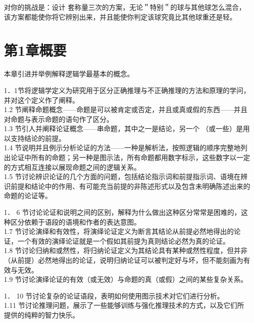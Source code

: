 对你的挑战是：设计 套称量三次的方案，无论＂特别＂的球与其他球怎么混合，该方案都能使你将它辨别出来，并且能使你判定该球究竟比其他球重还是轻。

\section*{第1章概要}
本章引进并举例解释逻辑学最基本的概念。

1．1节将逻辑学定义为研究用于区分正确推理与不正确推理的方法和原理的学问，并对这个定义作了阐释。\\
1.2 节阐释命题概念——命题是可以被肯定或否定，并且或真或假的东西——并且对命题与表示命题的语句作了区分。\\
1.3 节引人并阐释论证概念——串命题，其中之一是结论，另一个 （或一些）是用以支持结论的前提。\\
1.4 节说明并且例示分析论证的方法——一种是解析法，按照逻辑的顺序完整地列出论证中所有的命题；另一种是图示法，所有命题都用数字标示，这些数字以一定的方式相互连接以展现命题之间的逻辑关系。\\
1.5 节讨论辨识论证的几个方面的问题，包括结论指示词和前提指示词、语境在辨识前提和结论中的作用、有可能充当前提的非陈述形式以及包含未明确陈述出来的命题的论证等。

1． 6 节讨论论证和说明之间的区别，解释为什么做出这种区分常常是困难的，这种区分依赖于语段的语境和作者的表达意图。\\
1.7 节讨论演绎和有效性，将演绎论证定义为断言其结论从前提必然地得出的论证，一个有效的演绎论证就是一个假如其前提为真则结论必然为真的论证。\\
1.8 节讨论归纳和或然性，将归纳论证定义为其结论具有某种或然性程度，但并非（从前提）必然地得出的论证，说明归纳论证可以被判定好与坏，但不能刻画为有效与无效。\\
1.9 节讨论演绎论证的有效（或无效）与命题的真（或假）之间的某些复杂关系。

1． 10 节讨论复杂的论证语段，表明如何使用图示技术对它们进行分析。\\
1.11 节讨论推理问题，展示了一些能够训练与强化推理技术的方式，以及它们所提供的纯粹的智力快乐。


